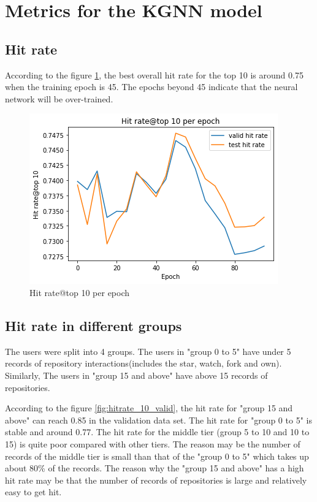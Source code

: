 \documentclass[11pt,twoside]{report}
\begin{document}
\section{Metrics for the KGNN model}
\subsection{Hit rate}
According to the figure \ref{fig:hitrate_10}, the best overall hit rate for the top 10 is around 0.75 when the training epoch is 45. The epochs beyond 45 indicate that the neural network will be over-trained.

\begin{figure}[H]
    \centering
    \includegraphics[scale=0.9]{hitrate@10.png}
    \caption{Hit rate@top 10 per epoch}
    \label{fig:hitrate_10}
\end{figure}

\subsection{Hit rate in different groups}
The users were split into 4 groups. The users in "group 0 to 5" have under 5 records of repository interactions(includes the star, watch, fork and own). Similarly, The users in "group 15 and above" have above 15 records of repositories.

According to the figure \ref{fig:hitrate_10_valid}, the hit rate for "group 15 and above" can reach 0.85 in the validation data set. The hit rate for "group 0 to 5" is stable and around 0.77. The hit rate for the middle tier (group 5 to 10 and 10 to 15) is quite poor compared with other tiers. The reason may be the number of records of the middle tier is small than that of the "group 0 to 5" which takes up about 80\% of the records. The reason why the "group 15 and above" has a high hit rate may be that the number of records of repositories is large and relatively easy to get hit.
\end{document}
